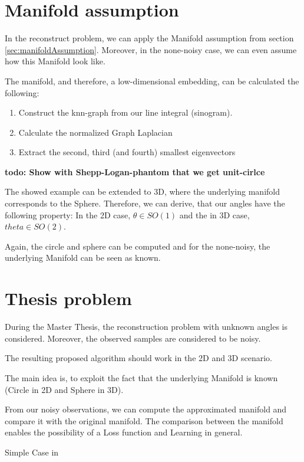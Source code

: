 \section{Manifold assumption}
In the reconstruct problem, we can apply the Manifold assumption from section \ref{sec:manifoldAssumption}.
Moreover, in the none-noisy case, we can even assume how this Manifold look like.

The manifold, and therefore, a low-dimensional embedding, can be calculated the following:

\begin{enumerate}
    \item Construct the knn-graph from our line integral (sinogram).
    \item Calculate the normalized Graph Laplacian
    \item Extract the second, third (and fourth) smallest eigenvectors
\end{enumerate}

\textbf{todo: Show with Shepp-Logan-phantom that we get unit-cirlce}

The showed example can be extended to 3D, where the underlying manifold corresponds to the Sphere.
Therefore, we can derive, that our angles have the following property:
In the 2D case, $\theta \in SO(1)$ and the in 3D case, $theta \in SO(2)$.

Again, the circle and sphere can be computed and for the none-noisy, the underlying Manifold can be seen as known.


\section{Thesis problem}
During the Master Thesis, the reconstruction problem with unknown angles is considered. 
Moreover, the observed samples are considered to be noisy. 

The resulting proposed algorithm should work in the 2D and 3D scenario.

The main idea is, to exploit the fact that the underlying Manifold is known (Circle in 2D and Sphere in 3D). 

From our noisy observations, we can compute the approximated manifold and compare it with the original manifold.
The comparison between the manifold enables the possibility of a Loss function and Learning in general.




Simple Case in 
